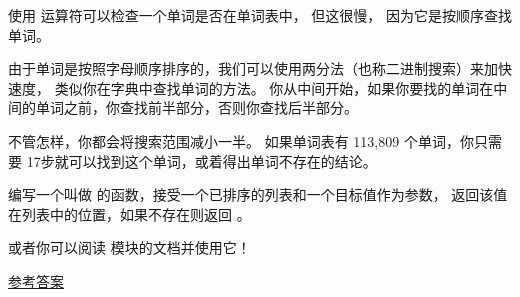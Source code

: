 \begin{exercise}
\label{wordlist1}
\label{bisection}
  
  
  


使用  运算符可以检查一个单词是否在单词表中， 但这很慢， 因为它是按顺序查找单词。


由于单词是按照字母顺序排序的，我们可以使用两分法（也称二进制搜索）来加快速度，
类似你在字典中查找单词的方法。 你从中间开始，如果你要找的单词在中间的单词之前，你查找前半部分，否则你查找后半部分。


不管怎样，你都会将搜索范围减小一半。
如果单词表有 113,809 个单词，你只需要 17步就可以找到这个单词，或着得出单词不存在的结论。


编写一个叫做  的函数，接受一个已排序的列表和一个目标值作为参数，
返回该值在列表中的位置，如果不存在则返回  。

  


或者你可以阅读  模块的文档并使用它！

\href{http://thinkpython2.com/code/inlist.py}{参考答案}

\end{exercise}

